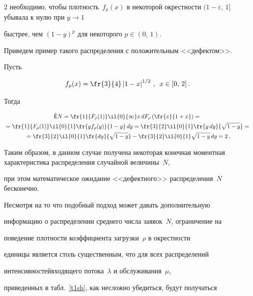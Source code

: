 \begin{multicols}{2}
необходимо, чтобы плотность~$f_\rho(x)$ в некоторой окрестности $(1-\varepsilon,\,1]$ убывала к нулю при $y\to 1$


быстрее, чем $(1-y)^p$ для некоторого $p\in(0,\,1)$.


Приведем пример такого распределения с положительным <<дефектом>>.





Пусть


$$


f_\rho(x)=\fr{3}{4}\left\vert1-x\right\vert^{{1}/{2}}\,,\enskip x\in[0,\,2]\,.


$$


Тогда


\begin{multline*}


\hat{\sf E}N=\fr{1}{F_\rho(1)}\il{0}{\infty}x\, dF_\rho\left(\fr{x}{1+x}\right)


={}\\


{}=\fr{1}{F_\rho(1)}\il{0}{1}\fr{yf_\rho(y)}{1-y}\,dy=


\fr{3}{2}\il{0}{1}\fr{y\,dy}{\sqrt{1-y}}={}\\


{}=\fr{3}{2}\il{0}{1}\fr{dy}{\sqrt{1-y}}-


\fr{3}{2}\il{0}{1}\sqrt{1-y}\,dy=2\,.


\end{multline*}





Таким образом, в данном случае получена некоторая конечная моментная характеристика распределения случайной величины~$N$, 


при этом математическое ожидание <<дефектного>> распределения~$N$ бесконечно.





Несмотря на то что подобный подход может давать дополнительную


информацию о распределении среднего числа заявок~$N$, ограничение на


поведение плотности коэффициента загрузки~$\rho$ в окрестности


единицы является столь существенным, что для всех распределений


интенсивностей\linebreak входящего потока~$\lambda$ и обслуживания~$\mu$,


приведенных в табл.~\ref{t1sh}, как несложно убедиться, будут получаться



\end{multicols}
